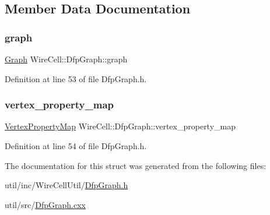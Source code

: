 \subsection{Member Data Documentation}
\mbox{\label{struct_wire_cell_1_1_dfp_graph_ab74af213f84aa4a942ec7327c24ac04f}} 
\subsubsection{\texorpdfstring{graph}{graph}}
{\footnotesize\ttfamily \hyperlink{struct_wire_cell_1_1_dfp_graph_ad5dd2546b355a72f5f24e90a985a45e9}{Graph} Wire\+Cell\+::\+Dfp\+Graph\+::graph}



Definition at line 53 of file Dfp\+Graph.\+h.

\mbox{\label{struct_wire_cell_1_1_dfp_graph_aab5d8374b32287d34d0d7226014f3958}} 
\subsubsection{\texorpdfstring{vertex\+\_\+property\+\_\+map}{vertex\_property\_map}}
{\footnotesize\ttfamily \hyperlink{struct_wire_cell_1_1_dfp_graph_a3908c3dc81685f845df6243825cc6021}{Vertex\+Property\+Map} Wire\+Cell\+::\+Dfp\+Graph\+::vertex\+\_\+property\+\_\+map}



Definition at line 54 of file Dfp\+Graph.\+h.



The documentation for this struct was generated from the following files\+:\begin{DoxyCompactItemize}
\item 
util/inc/\+Wire\+Cell\+Util/\hyperlink{_dfp_graph_8h}{Dfp\+Graph.\+h}\item 
util/src/\hyperlink{_dfp_graph_8cxx}{Dfp\+Graph.\+cxx}\end{DoxyCompactItemize}
